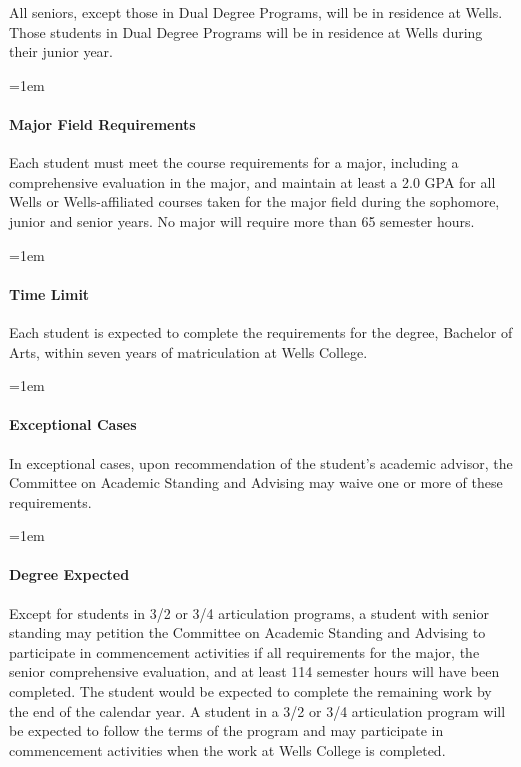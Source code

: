 \documentclass{manual}
\newcommand{\modified}[1]{}
\newcommand{\oldbreak}[1]{}
\let\oldparagraph\paragraph
\renewcommand\paragraph{\leftskip=1em\oldparagraph}
\newcommand{\editRemove}[1]{}
\newcommand{\they}{(pronoun)~ }
\begin{document}
All seniors, except those in Dual Degree Programs, will be in residence at Wells. Those students in Dual Degree Programs will be in residence at Wells during their junior year.

\oldbreak{IV-I}

\paragraph{Major Field Requirements}

Each \modified{5/13/93}  student must meet the course requirements for a major, including a comprehensive evaluation in the major, and maintain at least a 2.0 GPA for all Wells or Wells-affiliated courses taken for the major field during the sophomore, junior and senior years. No major will require more than 65 semester hours.

\paragraph{Time Limit}

Each student is expected to complete the requirements for the degree, Bachelor of Arts, within seven years of matriculation at Wells College. 

\paragraph{Exceptional Cases}

In exceptional cases, upon recommendation of the student's academic advisor, the Committee on Academic Standing and Advising may waive one or more of these requirements.

\paragraph{Degree Expected}

 Except\modified{9/9/97}  for students in 3/2 or 3/4 articulation programs, a student with senior standing may petition the Committee on Academic Standing and Advising to participate in commencement activities if \editRemove{\they will have completed} all requirements for the major, the senior comprehensive evaluation, and at least 114 semester hours will have been completed. The student would be expected to complete the remaining work by the end of the calendar year. A student in a 3/2 or 3/4 articulation program will be expected to follow the terms of the program and may participate in commencement activities when the work at Wells College is completed.
\end{document}
